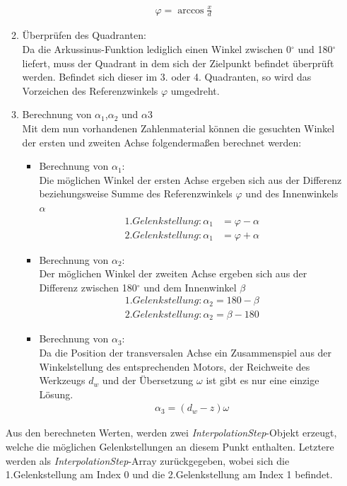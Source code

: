 \begin{itemize}
\begin{enumerate}
\begin{align*}
\varphi = \arccos \frac{x}{d}
\end{align*}
\item Überprüfen des Quadranten:\\
Da die Arkussinus-Funktion lediglich einen Winkel zwischen 0$^\circ$ und 180$^\circ$ liefert, muss der Quadrant in dem sich der Zielpunkt befindet überprüft werden. Befindet sich dieser im 3. oder 4. Quadranten, so wird das Vorzeichen des Referenzwinkels $\varphi$ umgedreht. 
\item Berechnung von $\alpha_1$,$\alpha_2$ und $\alpha3$\\
Mit dem nun vorhandenen Zahlenmaterial können die gesuchten Winkel der ersten und zweiten Achse folgendermaßen berechnet werden:
\begin{itemize}
\item Berechnung von $\alpha_1$:\\
Die möglichen Winkel der ersten Achse ergeben sich aus der Differenz beziehungsweise Summe des Referenzwinkels $\varphi$ und des Innenwinkels $\alpha$
\begin{align*}
1. Gelenkstellung: \alpha_1 &= \varphi - \alpha \\
2. Gelenkstellung: \alpha_1 &= \varphi + \alpha
\end{align*}
\item Berechnung von $\alpha_2$:\\
Der möglichen Winkel der zweiten Achse ergeben sich aus der Differenz zwischen 180$^\circ$ und dem Innenwinkel $\beta$
\begin{align*}
1. Gelenkstellung: \alpha_2 = 180 - \beta \\
2. Gelenkstellung: \alpha_2 = \beta - 180
\end{align*}
\item Berechnung von $\alpha_3$:\\
Da die Position der transversalen Achse ein Zusammenspiel aus der Winkelstellung des entsprechenden Motors, der Reichweite des Werkzeugs $d_w$ und der Übersetzung $\omega$ ist gibt es nur eine einzige Lösung.
\begin{align*}
\alpha_3 = (d_w-z)\omega
\end{align*}
\end{itemize}

\end{enumerate}
Aus den berechneten Werten, werden zwei \textit{InterpolationStep}-Objekt erzeugt, welche die möglichen Gelenkstellungen an diesem Punkt enthalten. Letztere werden als \textit{InterpolationStep}-Array zurückgegeben, wobei sich die 1.Gelenkstellung am Index 0 und die 2.Gelenkstellung am Index 1 befindet.
\end{itemize}

